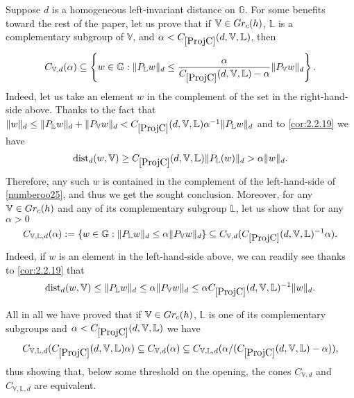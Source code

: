 \documentclass[10pt, a4paper,
oneside, headinclude,footinclude]{scrartcl}
\begin{document}
\begin{osservazione}\label{oss:ConiEquivalenti}Suppose $d$ is a homogeneous left-invariant distance on $\mathbb{G}$.
For some benefits toward the rest of the paper, let us prove that if $\mathbb V\in Gr_c(h)$, $\mathbb L$ is a complementary subgroup of $\mathbb V$, and $\alpha<\oldC{ProjC}(d,\mathbb V,\mathbb L)$, then
\begin{equation}
C_{\mathbb V,d}(\alpha)\subseteq \left\{w\in\mathbb G:\|P_\mathbb Lw\|_{d}\leq \frac{\alpha}{\oldC{ProjC}(d,\mathbb V,\mathbb L)-\alpha}\|P_\mathbb Vw\|_{d}\right\}.
    \label{numberoo25}
\end{equation}
Indeed, let us take an element $w$ in the complement of the set in the right-hand-side above. Thanks to the fact that  $\|w\|_{d}\leq\|P_\mathbb Lw\|_{d}+\|P_\mathbb Vw\|_{d}< \oldC{ProjC}(d,\mathbb V,\mathbb L)\alpha^{-1}\|P_\mathbb Lw\|_{d}$ and to \cref{cor:2.2.19} we have
\begin{equation}
    \begin{split}
        \mathrm{dist}_{d}(w,\mathbb V)\geq\oldC{ProjC}(d,\mathbb V,\mathbb L)\|P_\mathbb L(w)\|_{d}>\alpha\|w\|_{d}.
    \end{split}
\end{equation}
Therefore,  any such $w$ is contained in the complement of the left-hand-side of \eqref{numberoo25}, and thus we get the sought conclusion.
Moreover, for any $\mathbb V\in Gr_c(h)$ and any of its complementary subgroup $\mathbb{L}$, let us show that for any $\alpha>0$
$$
C_{\mathbb V,\mathbb L,d}(\alpha):=\{w\in\mathbb G:\|P_\mathbb Lw\|_d\leq \alpha\|P_\mathbb Vw\|_d\}\subseteq C_{\mathbb V,d}(\oldC{ProjC}(d,\mathbb V,\mathbb L)^{-1}\alpha).
$$
Indeed, if $w$ is an element in the left-hand-side above, we can readily see thanks to \cref{cor:2.2.19} that
$$
\mathrm{dist}_{d}(w,\mathbb V)\leq \|P_\mathbb Lw\|_{d}\leq \alpha\|P_\mathbb Vw\|_{d}\leq \alpha\oldC{ProjC}({d},\mathbb V,\mathbb L)^{-1}\|w\|_{d}.
$$


All in all we have proved that if $\mathbb V\in Gr_c(h)$, $\mathbb L$ is one of its complementary subgroups and $\alpha<\oldC{ProjC}(d,\mathbb V,\mathbb L)$ we have
$$
C_{\mathbb V,\mathbb L, d}(\oldC{ProjC}(d,\mathbb V,\mathbb L)\alpha)\subseteq C_{\mathbb V,d}(\alpha)\subseteq C_{\mathbb V,\mathbb L,d}(\alpha/(\oldC{ProjC}(d,\mathbb V,\mathbb L)-\alpha)),
$$
thus showing that, below some threshold on the opening, the cones $C_{\mathbb V,d}$ and $C_{\mathbb V,\mathbb 
L,d}$ are equivalent.
\end{osservazione}
\end{document}
